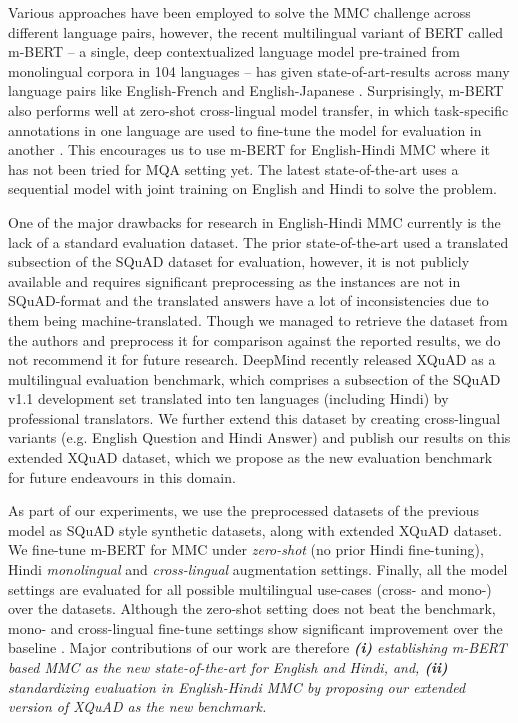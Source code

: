 \documentclass[acmsmall]{acmart}
\begin{document}
\par Various approaches have been employed to solve the MMC challenge across different language pairs, however, the recent multilingual variant of BERT \cite{bert} called m-BERT -- a single, deep contextualized language model pre-trained from monolingual corpora in 104 languages -- has given state-of-art-results across many language pairs like English-French and English-Japanese \cite{multilingualQA}. Surprisingly, m-BERT also performs well at zero-shot cross-lingual model transfer, in which task-specific annotations in one language are used to fine-tune the model for evaluation in another \cite{bert-multilingual}. This encourages us to use m-BERT for English-Hindi MMC where it has not been tried for MQA setting yet. The latest state-of-the-art \cite{latestMQA} uses a sequential model with joint training on English and Hindi to solve the problem. 
\par One of the major drawbacks for research in English-Hindi MMC currently is the lack of a standard evaluation dataset. The prior state-of-the-art \cite{latestMQA} used a translated subsection of the SQuAD \cite{squad2.0} dataset for evaluation, however, it is not publicly available and requires significant preprocessing as the instances are not in SQuAD-format and the translated answers have a lot of inconsistencies due to them being machine-translated. Though we managed to retrieve the dataset from the authors and preprocess it for comparison against the reported results, we do not recommend it for future research. DeepMind recently released  XQuAD \cite{xquad} as a multilingual evaluation benchmark, which comprises a subsection of the SQuAD v1.1 \cite{squad} development set translated into ten languages (including Hindi) by professional translators. We further extend this dataset by creating cross-lingual variants (e.g. English Question and Hindi Answer) and publish our results on this extended XQuAD dataset, which we propose as the new evaluation benchmark for future endeavours in this domain. 
\par  As part of our experiments, we use the preprocessed datasets of the previous model \cite{latestMQA} as SQuAD \cite{squad} style synthetic datasets, along with extended XQuAD dataset. We fine-tune m-BERT for MMC under \textit{zero-shot} (no prior Hindi fine-tuning), Hindi \textit{monolingual} and \textit{cross-lingual} augmentation settings. Finally, all the model settings are evaluated for all possible multilingual use-cases (cross- and mono-) over the datasets.  Although the zero-shot setting does not beat the benchmark, mono- and cross-lingual fine-tune settings show significant improvement over the baseline \cite{latestMQA}. Major contributions of our work are therefore \textit{\textbf{(i) }establishing m-BERT based MMC as the new state-of-the-art for English and Hindi, and, \textbf{(ii) } standardizing evaluation in English-Hindi MMC by proposing our extended version of XQuAD as the new benchmark.} 
\end{document}
